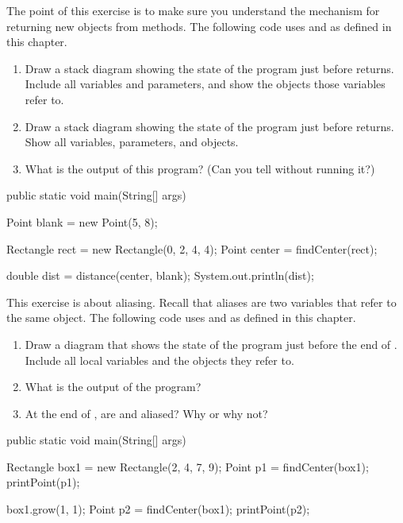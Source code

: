 \begin{exercise}  %

The point of this exercise is to make sure you understand the mechanism for returning new objects from methods.
The following code uses  and  as defined in this chapter.

\begin{enumerate}

\item Draw a stack diagram showing the state of the program just before  returns.
Include all variables and parameters, and show the objects those variables refer to.

\item Draw a stack diagram showing the state of the program just before  returns.
Show all variables, parameters, and objects.

\item What is the output of this program?
(Can you tell without running it?)

\end{enumerate}

\begin{code}
public static void main(String[] args) {
    Point blank = new Point(5, 8);

    Rectangle rect = new Rectangle(0, 2, 4, 4);
    Point center = findCenter(rect);

    double dist = distance(center, blank);
    System.out.println(dist);
}
\end{code}

\end{exercise}


\begin{exercise}  %

This exercise is about aliasing.
Recall that aliases are two variables that refer to the same object.
The following code uses  and  as defined in this chapter.

\begin{enumerate}

\item Draw a diagram that shows the state of the program just before the end of .
Include all local variables and the objects they refer to.

\item What is the output of the program?

\item At the end of , are  and  aliased?
Why or why not?

\end{enumerate}

\begin{code}
public static void main(String[] args) {
    Rectangle box1 = new Rectangle(2, 4, 7, 9);
    Point p1 = findCenter(box1);
    printPoint(p1);

    box1.grow(1, 1);
    Point p2 = findCenter(box1);
    printPoint(p2);
}
\end{code}

\end{exercise}
